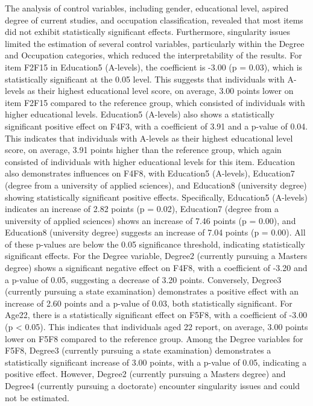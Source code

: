\documentclass[
  12pt,
  a4paper,
  twoside]{article}
\begin{document}
The analysis of control variables, including gender, educational level, aspired degree of current studies, and occupation classification, revealed that most items did not exhibit statistically significant effects. Furthermore, singularity issues limited the estimation of several control variables, particularly within the Degree and Occupation categories, which reduced the interpretability of the results.
For item F2F15 in Education5 (A-levels), the coefficient is -3.00 (p = 0.03), which is statistically significant at the 0.05 level. This suggests that individuals with A-levels as their highest educational level score, on average, 3.00 points lower on item F2F15 compared to the reference group, which consisted of individuals with higher educational levels.
Education5 (A-levels) also shows a statistically significant positive effect on F4F3, with a coefficient of 3.91 and a p-value of 0.04. This indicates that individuals with A-levels as their highest educational level score, on average, 3.91 points higher than the reference group, which again consisted of individuals with higher educational levels for this item.
Education also demonstrates influences on F4F8, with Education5 (A-levels), Education7 (degree from a university of applied sciences), and Education8 (university degree) showing statistically significant positive effects. Specifically, Education5 (A-levels) indicates an increase of 2.82 points (p = 0.02), Education7 (degree from a university of applied sciences) shows an increase of 7.46 points (p = 0.00), and Education8 (university degree) suggests an increase of 7.04 points (p = 0.00). All of these p-values are below the 0.05 significance threshold, indicating statistically significant effects.
For the Degree variable, Degree2 (currently pursuing a Masters degree) shows a significant negative effect on F4F8, with a coefficient of -3.20 and a p-value of 0.05, suggesting a decrease of 3.20 points. Conversely, Degree3 (currently pursuing a state examination) demonstrates a positive effect with an increase of 2.60 points and a p-value of 0.03, both statistically significant.
For Age22, there is a statistically significant effect on F5F8, with a coefficient of -3.00 (p \textless{} 0.05). This indicates that individuals aged 22 report, on average, 3.00 points lower on F5F8 compared to the reference group.
Among the Degree variables for F5F8, Degree3 (currently pursuing a state examination) demonstrates a statistically significant increase of 3.00 points, with a p-value of 0.05, indicating a positive effect. However, Degree2 (currently pursuing a Masters degree) and Degree4 (currently pursuing a doctorate) encounter singularity issues and could not be estimated.
\end{document}
